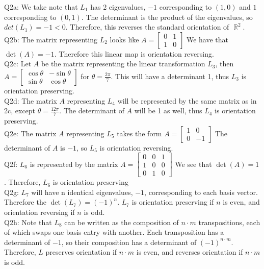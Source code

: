 \documentclass[letterpaper]{article}
\DeclareMathOperator{\R}{\mathbb{R}}
\begin{document}
\noindent Q2a: We take note that $L_1$ has 2 eigenvalues, $-1$ corresponding to $(1,0)$ and $1$ corresponding to $(0,1)$. The determinant is the product of the eigenvalues, so $det(L_1)=-1<0$. Therefore, this reverses the standard orientation of $\R^2$. 
\newline \\ Q2b: The matrix representing $L_2$ looks like $A= \begin{bmatrix}
    0 & 1 \\ 1 & 0
\end{bmatrix}$ We have that $\det(A) = -1$. Therefore this linear map is orientation reversing. 
\newline \\ Q2c: Let $A$ be the matrix representing the linear transformation $L_3$, then $A = \begin{bmatrix}
    \cos \theta & -\sin \theta \\ \sin \theta & \cos \theta
\end{bmatrix}$ for $\theta = \frac{2\pi}{7}$. This will have a determinant 1, thus $L_3$ is orientation preserving. 
\newline \\ Q2d: The matrix $A$ representing $L_4$ will be represented by the same matrix as in 2c, except $\theta = \frac{12\pi}{7}$. The determinant of $A$ will be 1 as well, thus $L_4$ is orientation preserving. 
\newline \\ Q2e: The matrix $A$ representing $L_5$ takes the form $A = \begin{bmatrix}
    1 & 0 \\ 0 & -1
\end{bmatrix}$ The determinant of $A$ is $-1$, so $L_5$ is orientation reversing. 
\newline \\ Q2f: $L_6$ is represented by the matrix $A = \begin{bmatrix}
    0 & 0 & 1 \\ 1 & 0 & 0 \\ 0 & 1 & 0
\end{bmatrix}$ We see that $\det(A) = 1$. Therefore, $L_6$ is orientation preserving 
\newline \\ Q2g: $L_7$ will have n identical eigenvalues, $-1$, corresponding to each basis vector. Therefore the $\det(L_7) = (-1)^n$. $L_7$ is orientation preserving if $n$ is even, and orientation reversing if $n$ is odd. 
\newline \\ Q2h: Note that $L_8$ can be written as the composition of $n\cdot m$ transpositions, each of which swaps one basis entry with another. Each transposition has a determinant of $-1$, so their composition has a determinant of $(-1)^{n\cdot m}$. Therefore, $L$ preserves orientation if $n\cdot m$ is even, and reverses orientation if $n\cdot m$ is odd. 
\end{document}

